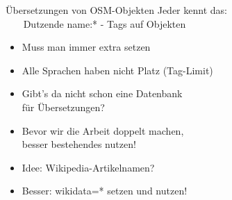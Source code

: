 \documentclass{beamer}
\begin{document}
{
\begin{frame}{Übersetzungen von OSM-Objekten}
      Jeder kennt das: \\ 
      ~~~ Dutzende name:* - Tags auf Objekten \pause
      \begin{itemize}
        \item Muss man immer extra setzen
        \item Alle Sprachen haben nicht Platz (Tag-Limit)
        \item Gibt's da nicht schon eine Datenbank \\ für Übersetzungen?
        \item Bevor wir die Arbeit doppelt machen, \\ besser bestehendes nutzen! \pause
        \item Idee: Wikipedia-Artikelnamen? \pause
 \vspace*{0.2cm}
        \item Besser: wikidata=* setzen und nutzen! 
      \end{itemize}

\end{frame}
}
\end{document}
